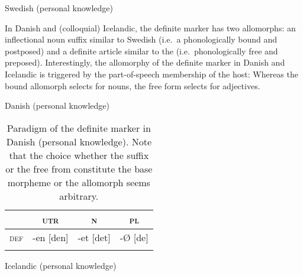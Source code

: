 {\begin{exe}
\ex \rm{Swedish (personal knowledge)}
\begin{xlist}
\end{xlist}
\end{exe}
In Danish and (colloquial) Icelandic, the definite marker has two allomorphs: an inflectional noun suffix similar to Swedish (i.e.~a phonologically bound and postposed) and a definite article similar to the  (i.e.~phonologically free and preposed). Interestingly, the allomorphy of the definite marker in Danish and Icelandic is triggered by the part-of-speech membership of the host: Whereas the bound allomorph selects for nouns, the free form selects for adjectives.
\begin{exe}
\ex \rm{Danish (personal knowledge)}
\begin{xlist}
\end{xlist}
\end{exe}
\begin{table}
\begin{tabular}{lccc}
\lsptoprule
			&\textsc{utr}	&\textsc{n}		&\textsc{pl}\\
\midrule
\textsc{def}	&-en [den]		&-et [det]			&-{Ø} [de]\\
\lspbottomrule
\end{tabular}
\caption[Paradigm of \textsc{def} in Danish]{Paradigm of the definite marker in Danish (personal knowledge). Note that the choice whether the suffix or the free from constitute the base morpheme or the allomorph seems arbitrary.}
\label{danish defallomorph}
\end{table}
\begin{exe}
\ex \rm{Icelandic (personal knowledge)}
\begin{xlist}
\end{xlist}
\end{exe}

}
